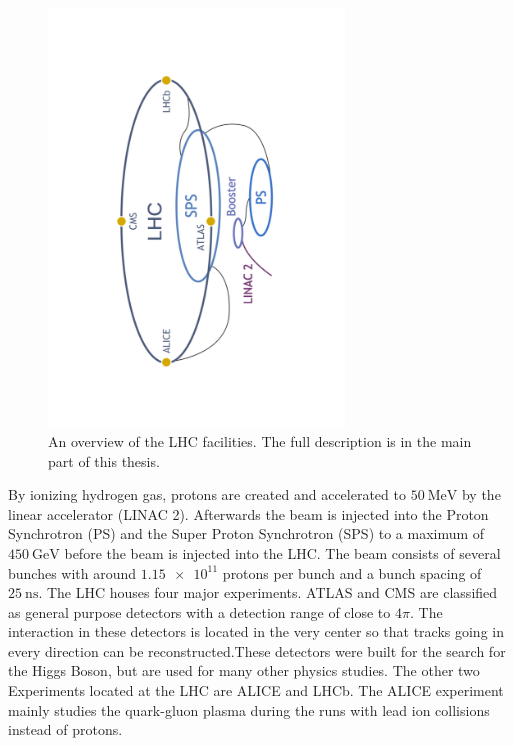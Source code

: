 \begin{figure}
  \centering
  \includegraphics[angle=-90, origin=c, width=0.7\textwidth]{plots/CERN_layout.pdf}
  \caption{An overview of the LHC facilities\cite{facilityCERN}. The full description is in the main part of this thesis.}
  \label{fig:CERN}
\end{figure}

By ionizing hydrogen gas, protons are created and accelerated to $\SI{50}{\mega\electronvolt}$ by the linear accelerator (LINAC 2). Afterwards the beam is injected into the Proton Synchrotron (PS) and the Super Proton Synchrotron (SPS) to a maximum of $\SI{450}{\giga\electronvolt}$ before the beam is injected into the LHC.
The beam consists of several bunches with around $\num{1.15e11}$ protons per bunch and a bunch spacing of $\SI{25}{\nano\second}$.%
The LHC houses four major experiments. ATLAS and CMS are classified as general purpose detectors with a detection range of close to $4\pi$. The interaction in these detectors is located in the very center so that tracks going in every direction can be reconstructed.These detectors were built for the search for the Higgs Boson, but are used for many other physics studies.
The other two Experiments located at the LHC are ALICE and LHCb.
The ALICE experiment mainly studies the quark-gluon plasma during the runs with lead ion collisions instead of protons.

